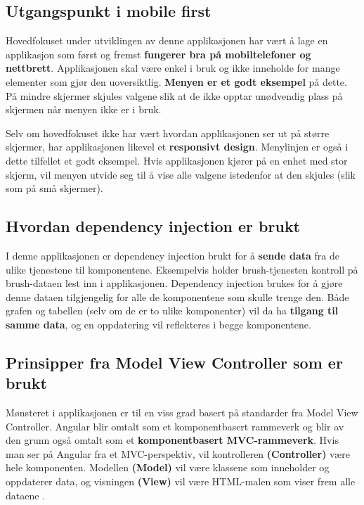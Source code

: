 \subsection{Utgangspunkt i mobile first}
Hovedfokuset under utviklingen av denne applikasjonen har vært å lage en applikasjon som først og fremst \textbf{fungerer bra på mobiltelefoner og nettbrett}. Applikasjonen skal være enkel i bruk og ikke inneholde for mange elementer som gjør den uoversiktlig. \textbf{Menyen er et godt eksempel} på dette. På mindre skjermer skjules valgene slik at de ikke opptar unødvendig plass på skjermen når menyen ikke er i bruk.

Selv om hovedfokuset ikke har vært hvordan applikasjonen ser ut på større skjermer, har applikasjonen likevel et \textbf{responsivt design}. Menylinjen er også i dette tilfellet et godt eksempel. Hvis applikasjonen kjører på en enhet med stor skjerm, vil menyen utvide seg til å vise alle valgene istedenfor at den skjules (slik som på små skjermer). 

\subsection{Hvordan dependency injection er brukt}
I denne applikasjonen er dependency injection brukt for å \textbf{sende data} fra de ulike tjenestene til komponentene. Eksempelvis holder brush-tjenesten kontroll på brush-dataen lest inn i applikasjonen. Dependency injection brukes for å gjøre denne dataen tilgjengelig for alle de komponentene som skulle trenge den. Både grafen og tabellen (selv om de er to ulike komponenter) vil da ha \textbf{tilgang til samme data}, og en oppdatering vil reflekteres i begge komponentene.

\subsection{Prinsipper fra Model View Controller som er brukt}
Mønsteret i applikasjonen er til en viss grad basert på standarder fra Model View Controller. Angular blir omtalt som et komponentbasert rammeverk og blir av den grunn også omtalt som et \textbf{komponentbasert MVC-rammeverk}. Hvis man ser på Angular fra et MVC-perspektiv, vil kontrolleren \textbf{(Controller)} være hele komponenten. Modellen \textbf{(Model)} vil være klassene som inneholder og oppdaterer data, og visningen \textbf{(View)} vil være HTML-malen som viser frem alle dataene \cite{angular_vs_react}.

